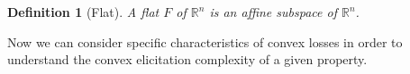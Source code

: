 \documentclass{article}
\newcommand{\reals}{\mathbb{R}}
\newcommand{\simplex}{\Delta_\Y}
\newcommand{\Y}{\mathcal{Y}}
\newcommand{\inprod}[2]{\langle #1, #2 \rangle}
\newtheorem{theorem}{Theorem}
\newtheorem{corollary}{Corollary}
\newtheorem{definition}{Definition}
\DeclareMathOperator*{\arginf}{arg\,inf}
\begin{document}
%

\begin{definition}[Flat]
	A \emph{flat} $F$ of $\reals^n$ is an affine subspace of $\reals^n$.
\end{definition}

Now we can consider specific characteristics of convex losses in order to understand the convex elicitation complexity of a given property.
\end{document}
